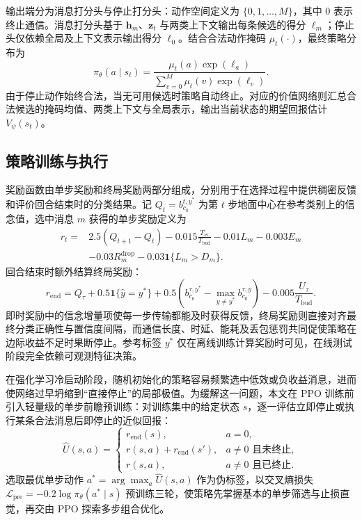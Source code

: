 \begin{figure}[htbp]
\centering

\label{rq2:fig:network}
\end{figure}

输出端分为消息打分头与停止打分头：动作空间定义为 $\{0,1,\ldots,M\}$，其中 $0$ 表示终止通信。消息打分头基于 $\bm h_m$、$\bm z_t$ 与两类上下文输出每条候选的得分 $\ell_m$；停止头仅依赖全局及上下文表示输出得分 $\ell_0$。结合合法动作掩码 $\mu_t(\cdot)$，最终策略分布为
\begin{equation}
\pi_\theta(a\mid s_t)=
\frac{\mu_t(a)\exp(\ell_a)}{\sum_{v=0}^M\mu_t(v)\exp(\ell_v)}.
\label{rq2:eq:policy}
\end{equation}
由于停止动作始终合法，当无可用候选时策略自动终止。对应的价值网络则汇总合法候选的掩码均值、两类上下文与全局表示，输出当前状态的期望回报估计 $V_\psi(s_t)$。

\subsection{策略训练与执行}

奖励函数由单步奖励和终局奖励两部分组成，分别用于在选择过程中提供稠密反馈和评价回合结束时的分类结果。记 $Q_t=b_{c_0}^{t,y^*}$ 为第 $t$ 步地面中心在参考类别上的信念值，选中消息 $m$ 获得的单步奖励定义为
\begin{equation}
\begin{aligned}
r_t={}&2.5(Q_{t+1}-Q_t)-0.015\frac{T_m}{T_{\mathrm{bud}}}
-0.01L_m-0.003E_m\\
&-0.03R_m^{\mathrm{drop}}-0.03\mathbf1\{L_m>D_m\}.
\end{aligned}
\label{rq2:eq:reward}
\end{equation}
回合结束时额外结算终局奖励：
\begin{equation}
r_{\mathrm{end}}=Q_{\tau}+0.5\mathbf1\{\hat y=y^*\}
+0.5\left(b_{c_0}^{\tau,y^*}-\max_{y\ne y^*}b_{c_0}^{\tau,y}\right)
-0.005\frac{U_{\tau}}{T_{\mathrm{bud}}}.
\label{rq2:eq:terminal}
\end{equation}
即时奖励中的信念增量项使每一步传输都能及时获得反馈，终局奖励则直接对齐最终分类正确性与置信度间隔，而通信长度、时延、能耗及丢包惩罚共同促使策略在边际收益不足时果断停止。参考标签 $y^*$ 仅在离线训练计算奖励时可见，在线测试阶段完全依赖可观测特征决策。

在强化学习冷启动阶段，随机初始化的策略容易频繁选中低效或负收益消息，进而使网络过早坍缩到“直接停止”的局部极值。为缓解这一问题，本文在 PPO 训练前引入轻量级的单步前瞻预训练：对训练集中的给定状态 $s$，逐一评估立即停止或执行某条合法消息后即停止的近似回报：
\begin{equation}
\widehat U(s,a)=
\begin{cases}
r_{\mathrm{end}}(s),&a=0,\\
r(s,a)+r_{\mathrm{end}}(s'),&a\ne0\text{ 且未终止},\\
r(s,a),&a\ne0\text{ 且已终止}.
\end{cases}
\label{rq2:eq:proxy}
\end{equation}
选取最优单步动作 $a^*=\arg\max_a\widehat U(s,a)$ 作为伪标签，以交叉熵损失 $\mathcal L_{\mathrm{pre}}=-0.2\log\pi_\theta(a^*\mid s)$ 预训练三轮，使策略先掌握基本的单步筛选与止损直觉，再交由 PPO 探索多步组合优化。

